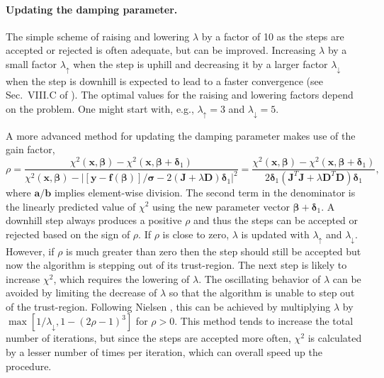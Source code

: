 \documentclass{article}
\begin{document}
\paragraph{Updating the damping parameter.} The simple scheme of raising and lowering $\lambda$ by a factor of 10 as the steps are accepted or rejected is often adequate, but can be improved. Increasing $\lambda$ by a small factor $\lambda_\uparrow$ when the step is uphill and decreasing it by a larger factor $\lambda_\downarrow$ when the step is downhill is expected to lead to a faster convergence (see Sec.~VIII.C of \cite{transtrum11}). The optimal values for the raising and lowering factors depend on the problem. One might start with, e.g., $\lambda_\uparrow=3$ and $\lambda_\downarrow=5$.

A more advanced method for updating the damping parameter makes use of the gain factor,
\begin{equation}
  \label{eq:gain_factor}
  \rho = \frac{\chi^2(\bm x, \bm\beta) - \chi^2(\bm x,
    \bm\beta+\bm\delta_1)}{\chi^2(\bm x, \bm\beta) - \left| [\bm y
      - \bm f(\bm\beta)]/\bm\sigma - 2(\bm J+\lambda\bm
      D)\bm\delta_1 \right|^2} = \frac{\chi^2(\bm x, \bm\beta) -
    \chi^2(\bm x, \bm\beta+\bm\delta_1)}{2\bm\delta_1(\bm J^T\bm
    J+\lambda\bm D^T\bm D)\bm\delta_1},
\end{equation}
where $\bm a/\bm b$ implies element-wise division. The second term in the denominator is the linearly predicted value of $\chi^2$ using the new parameter vector $\bm\beta+\bm\delta_1$. A downhill step always produces a positive $\rho$ and thus the steps can be accepted or rejected based on the sign of $\rho$. If $\rho$ is close to zero, $\lambda$ is updated with $\lambda_\uparrow$ and $\lambda_\downarrow$. However, if $\rho$ is much greater than zero then the step should still be accepted but now the algorithm is stepping out of its trust-region. The next step is likely to increase $\chi^2$, which requires the lowering of $\lambda$. The oscillating behavior of $\lambda$ can be avoided by limiting the decrease of $\lambda$ so that the algorithm is unable to step out of the trust-region. Following Nielsen \cite{nielsen99}, this can be achieved by multiplying $\lambda$ by $\max[1/\lambda_\downarrow,1-(2\rho-1)^3]$ for $\rho>0$. This method tends to increase the total number of iterations, but since the steps are accepted more often, $\chi^2$ is calculated by a lesser number of times per iteration, which can overall speed up the procedure.
\end{document}

